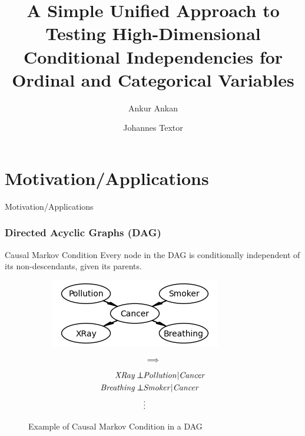 \documentclass{beamer}
\def\ci{\perp\!\!\!\!\!\perp}
\begin{document}
\title[Unified CI test for Ordinal and Categorical Variables]{A Simple Unified Approach to Testing High-Dimensional Conditional Independencies for Ordinal and Categorical Variables}
\author {Ankur Ankan \and Johannes Textor}
\date{}
\maketitle


\section{Motivation/Applications}
\begin{frame}
	\begin{center} \Huge{Motivation/Applications} \end{center}
\end{frame}
\begin{frame}
	\frametitle{Directed Acyclic Graphs (DAG)}
	\begin{block}{Causal Markov Condition}
		Every node in the DAG is conditionally independent of its non-descendants, given its parents.
	\end{block}
	\begin{figure}
		\begin{subfigure}{0.46\textwidth}
			\centering
			\includegraphics[scale=0.7]{imgs/example_dag.png}
		\end{subfigure}%
		\begin{subfigure}{0.08\textwidth}
			$$ \bm{\implies} $$
		\end{subfigure}%
		\begin{subfigure}{0.46\textwidth}
			\begin{equation*}
				\begin{split}
					\text{\emph{XRay}} \ci & \text{\emph{Pollution}} | \text{\emph{Cancer}} \\
					\text{\emph{Breathing}} \ci & \text{\emph{Smoker}} | \text{\emph{Cancer}} \\
					& \vdots \\
				\end{split}
			\end{equation*}
		\end{subfigure}
		\caption*{Example of Causal Markov Condition in a DAG \footnotemark}
	\end{figure}
\end{frame}
\end{document}
